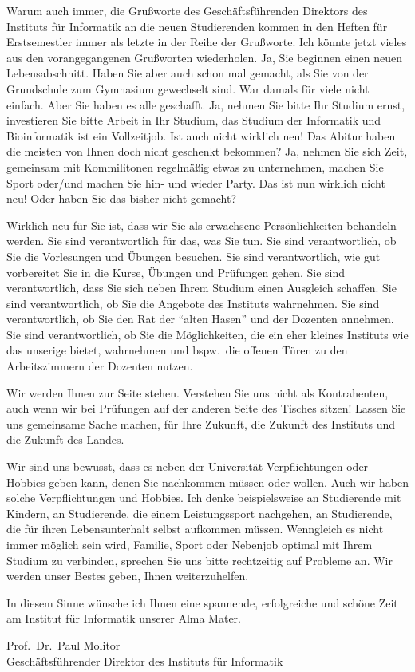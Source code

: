 Warum auch immer, die Grußworte des Geschäftsführenden Direktors des Instituts
für Informatik an die neuen Studierenden kommen in den Heften für Erstsemestler
immer als letzte in der Reihe der Grußworte. Ich könnte jetzt vieles aus den
vorangegangenen Grußworten wiederholen. Ja, Sie beginnen einen neuen
Lebensabschnitt. Haben Sie aber auch schon mal  gemacht, als Sie von der
Grundschule zum Gymnasium gewechselt sind. War damals für viele nicht einfach.
Aber Sie haben es alle geschafft. Ja, nehmen Sie bitte Ihr Studium ernst,
investieren Sie bitte Arbeit in Ihr Studium, das Studium der Informatik und
Bioinformatik ist ein Vollzeitjob. Ist auch nicht wirklich neu! Das Abitur haben
die meisten von Ihnen doch nicht geschenkt bekommen? Ja, nehmen Sie sich Zeit,
gemeinsam mit Kommilitonen regelmäßig etwas zu unternehmen, machen Sie Sport
oder/und machen Sie hin- und wieder Party. Das ist nun wirklich nicht neu! Oder
haben Sie das bisher nicht gemacht?

Wirklich neu für Sie ist, dass wir Sie als erwachsene Persönlichkeiten behandeln
werden. Sie sind verantwortlich für das, was Sie tun. Sie sind verantwortlich,
ob Sie die Vorlesungen und Übungen besuchen. Sie sind verantwortlich, wie gut
vorbereitet Sie in die Kurse, Übungen und Prüfungen gehen. Sie sind
verantwortlich, dass Sie sich neben Ihrem Studium einen Ausgleich schaffen. Sie
sind verantwortlich, ob Sie die Angebote des Instituts wahrnehmen. Sie sind
verantwortlich, ob Sie den Rat der "`alten Hasen"' und der Dozenten annehmen. Sie
sind verantwortlich, ob Sie die Möglichkeiten, die ein eher kleines Instituts
wie das unserige bietet, wahrnehmen und bspw.\ die offenen Türen zu den
Arbeitszimmern der Dozenten nutzen.

Wir werden Ihnen zur Seite stehen. Verstehen Sie uns nicht als Kontrahenten,
auch wenn wir bei Prüfungen auf der anderen Seite des Tisches sitzen! Lassen Sie
uns gemeinsame Sache machen, für Ihre Zukunft, die Zukunft des Instituts und die
Zukunft des Landes.

Wir sind uns bewusst, dass es neben der Universität Verpflichtungen oder Hobbies
geben kann, denen Sie nachkommen müssen oder wollen. Auch wir haben solche
Verpflichtungen und Hobbies. Ich denke beispielsweise an Studierende mit
Kindern, an Studierende, die einem Leistungssport nachgehen, an Studierende, die
für  ihren Lebensunterhalt selbst aufkommen müssen. Wenngleich es nicht immer
möglich sein wird, Familie, Sport oder Nebenjob optimal mit Ihrem Studium zu
verbinden, sprechen Sie uns bitte rechtzeitig auf Probleme an. Wir werden unser
Bestes geben, Ihnen weiterzuhelfen.

In diesem Sinne wünsche ich Ihnen eine spannende, erfolgreiche und schöne Zeit
am Institut für Informatik unserer Alma Mater.

Prof.\ Dr.\ Paul Molitor \\
Geschäftsführender Direktor des Instituts für Informatik
